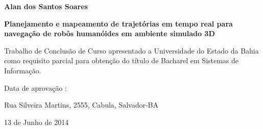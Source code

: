 \documentclass[font=plain]{abnt}
\begin{document}
    \folhaderosto %

    \begin{folhadeaprovacao}
    
	\begin{center}

	{\large \textbf{Alan dos Santos Soares}}
	
	\vspace*{\fill}\vspace*{\fill}
	
	\begin{center}
	 \sf\Large\textbf{Planejamento e mapeamento de trajetórias em tempo real para navegação de robôs humanóides em ambiente simulado 3D}
	\end{center}

	\vspace*{\fill}
	
	\hspace{.45\textwidth}
	\begin{minipage}{.5\textwidth}
	Trabalho de Conclusão de Curso apresentado a Universidade do Estado da Bahia como requisito parcial para obtenção do título de Bacharel em Sistemas de Informação.
	\end{minipage}
	
	\end{center}
	
	Data de aprovação :
	\setlength{\ABNTsignthickness}{0.4pt}
	\setlength{\ABNTsignskip}{2cm}
	\hspace*{1cm}
	
	\begin{center}
	\vspace*{\fill}
	Rua Silveira Martins, 2555, Cabula, Salvador-BA
	\par
	13 de Junho de 2014
	\vspace*{1cm}
	\end{center}
	
	
	
    \end{folhadeaprovacao}
    
\end{document}
